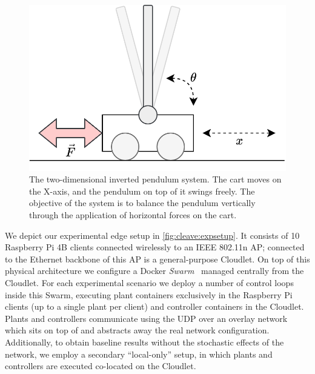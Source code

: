 \begin{figure}
    \centering
    \includegraphics[width=.95\columnwidth]{images/inverted_pendulum.png}
    \caption{
        The two-dimensional inverted pendulum system.
        The cart moves on the X-axis, and the pendulum on top of it swings freely.
        The objective of the system is to balance the pendulum vertically through the application of horizontal forces on the cart.
    }\label{fig:invpend}
\end{figure}

We depict our experimental edge setup in \cref{fig:cleave:expsetup}.
It consists of \num{10} Raspberry Pi 4B  clients connected wirelessly to an IEEE 802.11n \ac{AP}; connected to the Ethernet backbone of this \ac{AP} is a general-purpose Cloudlet.
On top of this physical architecture we configure a Docker \emph{Swarm}~\cite{merkel2014docker,Swarm2021} managed centrally from the Cloudlet.
For each experimental scenario we deploy a number of control loops inside this Swarm, executing plant containers exclusively in the Raspberry Pi clients (up to a single plant per client) and controller containers in the Cloudlet.
Plants and controllers communicate using the \ac{UDP} over an overlay network which sits on top of and abstracts away the real network configuration.
Additionally, to obtain baseline results without the stochastic effects of the network, we employ a secondary ``local-only'' setup, in which plants and controllers are executed co-located on the Cloudlet.

